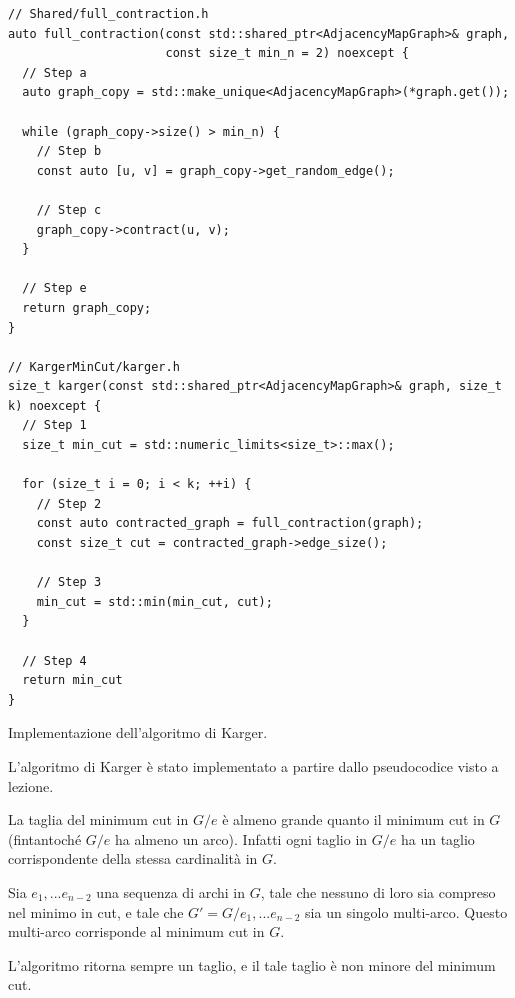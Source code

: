\begin{listing}[!ht]
\begin{verbatim}
// Shared/full_contraction.h
auto full_contraction(const std::shared_ptr<AdjacencyMapGraph>& graph,
                      const size_t min_n = 2) noexcept {
  // Step a
  auto graph_copy = std::make_unique<AdjacencyMapGraph>(*graph.get());

  while (graph_copy->size() > min_n) {
    // Step b
    const auto [u, v] = graph_copy->get_random_edge();

    // Step c
    graph_copy->contract(u, v);
  }

  // Step e
  return graph_copy;
}

// KargerMinCut/karger.h
size_t karger(const std::shared_ptr<AdjacencyMapGraph>& graph, size_t k) noexcept {
  // Step 1
  size_t min_cut = std::numeric_limits<size_t>::max();

  for (size_t i = 0; i < k; ++i) {
    // Step 2
    const auto contracted_graph = full_contraction(graph);
    const size_t cut = contracted_graph->edge_size();

    // Step 3
    min_cut = std::min(min_cut, cut);
  }

  // Step 4
  return min_cut
}
\end{verbatim}
\caption{Implementazione dell'algoritmo di Karger.}
\label{listing:karger}
\end{listing}

\noindent L'algoritmo di Karger è stato implementato a partire dallo pseudocodice visto a lezione. \\

\begin{obser}
La taglia del minimum cut in $ G/e $ è almeno grande quanto il minimum cut in $ G $  (fintantoché $ G/e $ ha almeno un arco). Infatti ogni taglio in $ G/e $ ha un taglio corrispondente della stessa cardinalità in $ G $.
\end{obser}

\begin{obser}
Sia $ e_1,...e_{n-2} $ una sequenza di archi in $ G $, tale che nessuno di loro sia compreso nel minimo in cut, e tale che $ G'=G/{ e_1,...e_{n-2}} $ sia un singolo multi-arco. Questo multi-arco corrisponde al minimum cut in $ G $.
\end{obser}

\begin{obser}
L'algoritmo ritorna sempre un taglio, e il tale taglio è non minore del minimum cut.
\end{obser}


